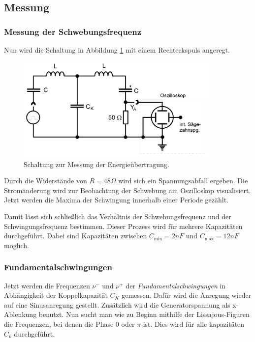 \subsection{Messung}
\subsubsection*{Messung der Schwebungsfrequenz}

Nun wird die Schaltung in Abbildung \ref{fig:schwebeschaltung} mit einem Rechteckspuls angeregt.

\begin{figure} 
    \centering
    \includegraphics[width=10cm] {pictures/schwebeschaltung.png} 
    \caption{Schaltung zur Messung der Energieübertragung. \cite{v355}}
    \label{fig:schwebeschaltung}
\end{figure} 

Durch die Widerstände von $R = 48 \Omega$ wird sich ein Spannungsabfall ergeben.
Die Stromänderung wird zur Beobachtung der Schwebung am Oszilloskop visualisiert.
Jetzt werden die Maxima der Schwingung innerhalb einer Periode gezählt.

Damit lässt sich schließlich das Verhältnis der Schwebungsfrequenz und der Schwingungsfrequenz bestimmen.
Dieser Prozess wird für mehrere Kapazitäten durchgeführt.
Dabei sind Kapazitäten zwischen $C_{\text{min}} = 2 nF$ und $C_{\text{max}} = 12 nF$ möglich.


\subsubsection*{Fundamentalschwingungen}

Jetzt werden die Frequenzen $\nu^{-}$ und $\nu^{+}$ der \textit{Fundamentalschwingungen} in 
Abhängigkeit der Koppelkapazität $C_{K}$ gemessen.
Dafür wird die Anregung wieder auf eine Sinusanregung gestellt.
Zusätzlich wird die Generatorspannung als x-Ablenkung benutzt.
Nun sucht man wie zu Beginn mithilfe der Lissajous-Figuren die Frequenzen, bei denen die Phase 0 oder $\pi$ ist.
Dies wird für alle kapazitäten $C_{k}$ durchgeführt.


